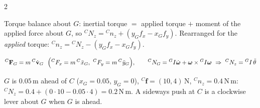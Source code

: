 \begin{multicols}{2}
\begin{deriv}
Torque balance about $G$: inertial torque $={}$ applied torque $+$ moment of the applied force about $G$, so ${}^CN_z={}^Cn_z+(y_Gf_x-x_Gf_y)$. Rearranged for the \emph{applied} torque: ${}^Cn_z={}^CN_z-(y_Gf_x-x_Gf_y)$.
\end{deriv}
\begin{fbx}
\[{}^C\mathbf F_G=m\,{}^C\dot{\mathbf v}_G\ \ \Big({}^CF_x=m\,{}^C\ddot x_G,\ {}^CF_y=m\,{}^C\ddot y_G\Big),\qquad {}^CN_G=\wEI\dot{\boldsymbol\omega}+\boldsymbol\omega\times\wEI\boldsymbol\omega\ \Rightarrow\ {}^CN_z=\wEI\,\wEthh\]
\end{fbx}
\begin{worked}
$G$ is $0.05$\,m ahead of $C$ ($x_G=0.05$, $y_G=0$), ${}^C\mathbf f=(10,4)$\,N, ${}^Cn_z=0.4$\,N\,m: ${}^CN_z=0.4+(0\cdot10-0.05\cdot4)=\mathbf{0.2}$\,N\,m. A sideways push at $C$ is a clockwise lever about $G$ when $G$ is ahead. \chk
\end{worked}


\end{multicols}
